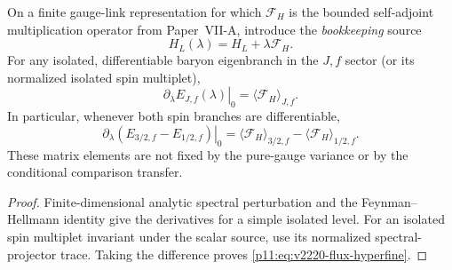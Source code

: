 \documentclass[12pt,a4paper]{article}
\begin{document}
\begin{proposition}
\label{p11:prop:v2220-flux-source-test}
On a finite gauge-link representation for which $\mathcal F_H$ is the
bounded self-adjoint multiplication operator from Paper~VII-A, introduce
the \emph{bookkeeping} source
\[
 H_L(\lambda)=H_L+\lambda\mathcal F_H.
\]
For any isolated, differentiable baryon eigenbranch in the $J,f$
sector (or its normalized isolated spin multiplet),
\begin{equation}
\label{p11:eq:v2220-flux-fh}
 \left.\partial_\lambda E_{J,f}(\lambda)\right|_{0}
 =\langle \mathcal F_H\rangle_{J,f}.
\end{equation}
In particular, whenever both spin branches are differentiable,
\begin{equation}
\label{p11:eq:v2220-flux-hyperfine}
 \left.\partial_\lambda(E_{3/2,f}-E_{1/2,f})\right|_0
 =\langle\mathcal F_H\rangle_{3/2,f}
  -\langle\mathcal F_H\rangle_{1/2,f}.
\end{equation}
These matrix elements are not fixed by the pure-gauge variance or by
the conditional comparison transfer.
\end{proposition}
\begin{proof}
Finite-dimensional analytic spectral perturbation and the
Feynman--Hellmann identity give the derivatives for a simple isolated
level.  For an isolated spin multiplet invariant under the scalar
source, use its normalized spectral-projector trace.  Taking the
difference proves \eqref{p11:eq:v2220-flux-hyperfine}.
\end{proof}
\end{document}
